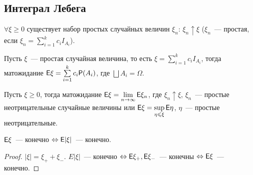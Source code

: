 \subsection{Интеграл Лебега}
\begin{lemma}[][б/д]
	$\forall \xi \geqslant 0$ существует набор простых случайных величин $\xi_n$: $\xi_n \uparrow \xi$ ($\xi_n$~--- простая, если $\xi_n = \sum\limits_{i = 1}^k c_iI_{A_i}$).
\end{lemma}
\begin{definition}
	Пусть $\xi$~--- простая случайная величина, то есть $\xi = \sum\limits_{i = 1}^k c_iI_{A_i}$, тогда матожидание $\mathsf{E} \xi = \sum\limits_{i = 1}^k c_i\mathsf{P}(A_i)$, где $\bigsqcup A_i = \Omega$.
\end{definition}
\begin{definition}
	Пусть $\xi \geqslant 0$, тогда матожидание $\mathsf{E} \xi = \lim\limits_{n \rightarrow \infty} \mathsf{E} \xi_n$, где $\xi_n \uparrow \xi$, $\xi_n$~--- простые неотрицательные случайные величины или $\mathsf{E} \xi = \sup\limits_{\eta \leqslant \xi}\mathsf{E}\eta$, $\eta$~--- простые неотрицательные. 
\end{definition}
\begin{consequence}
	$\mathsf{E} \xi$~--- конечно $\Leftrightarrow \mathsf{E}|\xi|$~--- конечно.
	\begin{proof}
		$|\xi| = \xi_+ + \xi_-$. $E|\xi|$~--- конечно $\Leftrightarrow \mathsf{E}\xi_+, \mathsf{E}\xi_-$~--- конечны $\Leftrightarrow \mathsf{E}\xi$~--- конечно.
	\end{proof}
\end{consequence}
